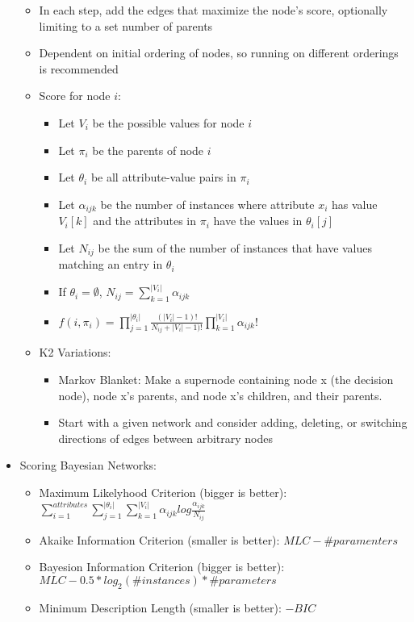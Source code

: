 \documentclass{article}
\begin{document}
\begin{itemize}
\begin{itemize}
			\item In each step, add the edges that maximize the node's score, optionally limiting to a set number of parents
			\item Dependent on initial ordering of nodes, so running on different orderings is recommended
			\item Score for node $i$:
				\begin{itemize}
					\item Let $V_i$ be the possible values for node $i$
					\item Let $\pi_i$ be the parents of node $i$
					\item Let $\theta_i$ be all attribute-value pairs in $\pi_i$
					\item Let $\alpha_{ijk}$ be the number of instances where attribute $x_i$ has value $V_i[k]$ and the attributes in $\pi_i$ have the values in $\theta_i[j]$
					\item Let $N_{ij}$ be the sum of the number of instances that have values matching an entry in $\theta_i$
					\item If $\theta_i = \emptyset$, $N_{ij} = \sum_{k=1}^{|V_i|} \alpha_{ijk}$
					\item $f(i, \pi_i) = \prod_{j=1}^{|\theta_i|} 	\frac{(|V_i| - 1)!}{N_{ij} + |V_i| - 1)!} \prod_{k=1}^{|V_i|} \alpha_{ijk}! $
				\end{itemize}
			\item K2 Variations:
				\begin{itemize}
					\item Markov Blanket: Make a supernode containing node x (the decision node), node x's parents, and node x's children, and their parents.
					\item Start with a given network and consider adding, deleting, or switching directions of edges between arbitrary nodes
				\end{itemize}
		\end{itemize}
	\item Scoring Bayesian Networks:
		\begin{itemize}
			\item Maximum Likelyhood Criterion (bigger is better): $\sum_{i=1}^{attributes}\sum_{j=1}^{|\theta_i|}\sum_{k=1}^{|V_i|} \alpha_{ijk} log \frac{\alpha_{ijk}}{N_ {ij}}$
			\item Akaike Information Criterion (smaller is better): $MLC - \#paramenters$
			\item Bayesion Information Criterion (bigger is better): $MLC - 0.5 * log_2(\#instances) * \#parameters$
			\item Minimum Description Length (smaller is better): $-BIC$
		\end{itemize}
\end{itemize}
\end{document}
